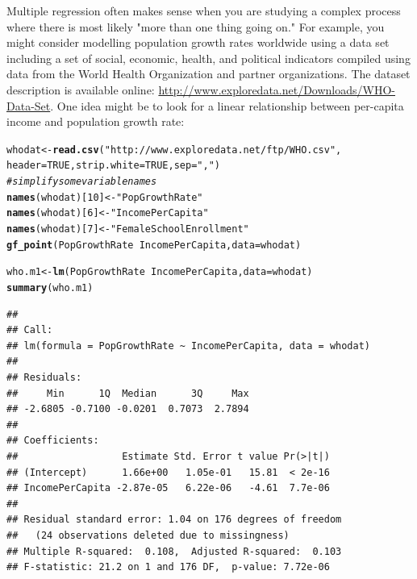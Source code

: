 \documentclass[twoside]{book}\usepackage[]{graphicx}\usepackage[]{xcolor}
\makeatletter
\newcommand{\hlnum}[1]{\textcolor[rgb]{0.686,0.059,0.569}{#1}}%
\newcommand{\hlstr}[1]{\textcolor[rgb]{0.192,0.494,0.8}{#1}}%
\newcommand{\hlcom}[1]{\textcolor[rgb]{0.678,0.584,0.686}{\textit{#1}}}%
\newcommand{\hlopt}[1]{\textcolor[rgb]{0,0,0}{#1}}%
\newcommand{\hlstd}[1]{\textcolor[rgb]{0.345,0.345,0.345}{#1}}%
\newcommand{\hlkwb}[1]{\textcolor[rgb]{0.69,0.353,0.396}{#1}}%
\newcommand{\hlkwc}[1]{\textcolor[rgb]{0.333,0.667,0.333}{#1}}%
\newcommand{\hlkwd}[1]{\textcolor[rgb]{0.737,0.353,0.396}{\textbf{#1}}}%
\newenvironment{kframe}{%
 \def\at@end@of@kframe{}%
 \ifinner\ifhmode%
  \def\at@end@of@kframe{\end{minipage}}%
  \begin{minipage}{\columnwidth}%
 \fi\fi%
 \def\FrameCommand##1{\hskip\@totalleftmargin \hskip-\fboxsep
 \colorbox{shadecolor}{##1}\hskip-\fboxsep
     \hskip-\linewidth \hskip-\@totalleftmargin \hskip\columnwidth}%
 \MakeFramed {\advance\hsize-\width
   \@totalleftmargin\z@ \linewidth\hsize
   \@setminipage}}%
 {\par\unskip\endMakeFramed%
 \at@end@of@kframe}
\newenvironment{knitrout}{}{} %
\newcounter{example}[section]
\makeatother
\begin{document}
Multiple regression often makes sense when you are studying a complex process where there is most likely "more than one thing going on."  For example, you might consider modelling population growth rates worldwide using a data set including a set of social, economic, health, and political indicators compiled using data from the World Health Organization and partner organizations. The dataset description is available online: \url{http://www.exploredata.net/Downloads/WHO-Data-Set}.  One idea might be to look for a linear relationship between per-capita income and population growth rate:
\begin{knitrout}
\color{fgcolor}\begin{kframe}
\begin{alltt}
\hlstd{whodat} \hlkwb{<-} \hlkwd{read.csv}\hlstd{(}\hlstr{"http://www.exploredata.net/ftp/WHO.csv"}\hlstd{,}
                   \hlkwc{header} \hlstd{=} \hlnum{TRUE}\hlstd{,} \hlkwc{strip.white} \hlstd{=} \hlnum{TRUE}\hlstd{,} \hlkwc{sep} \hlstd{=} \hlstr{","}\hlstd{)}
\hlcom{#simplify some variable names}
\hlkwd{names}\hlstd{(whodat)[}\hlnum{10}\hlstd{]} \hlkwb{<-} \hlstr{"PopGrowthRate"}
\hlkwd{names}\hlstd{(whodat)[}\hlnum{6}\hlstd{]} \hlkwb{<-} \hlstr{"IncomePerCapita"}
\hlkwd{names}\hlstd{(whodat)[}\hlnum{7}\hlstd{]} \hlkwb{<-} \hlstr{"FemaleSchoolEnrollment"}
\hlkwd{gf_point}\hlstd{(PopGrowthRate} \hlopt{~} \hlstd{IncomePerCapita,} \hlkwc{data} \hlstd{= whodat)}
\end{alltt}


{\ttfamily\noindent\color{warningcolor}{\#\# Warning: Removed 24 rows containing missing values (geom\_point).}}\begin{alltt}
\hlstd{who.m1} \hlkwb{<-} \hlkwd{lm}\hlstd{(PopGrowthRate} \hlopt{~} \hlstd{IncomePerCapita,} \hlkwc{data} \hlstd{= whodat)}
\hlkwd{summary}\hlstd{(who.m1)}
\end{alltt}
\begin{verbatim}
## 
## Call:
## lm(formula = PopGrowthRate ~ IncomePerCapita, data = whodat)
## 
## Residuals:
##     Min      1Q  Median      3Q     Max 
## -2.6805 -0.7100 -0.0201  0.7073  2.7894 
## 
## Coefficients:
##                  Estimate Std. Error t value Pr(>|t|)
## (Intercept)      1.66e+00   1.05e-01   15.81  < 2e-16
## IncomePerCapita -2.87e-05   6.22e-06   -4.61  7.7e-06
## 
## Residual standard error: 1.04 on 176 degrees of freedom
##   (24 observations deleted due to missingness)
## Multiple R-squared:  0.108,	Adjusted R-squared:  0.103 
## F-statistic: 21.2 on 1 and 176 DF,  p-value: 7.72e-06
\end{verbatim}
\end{kframe}


\end{knitrout}
\end{document}
